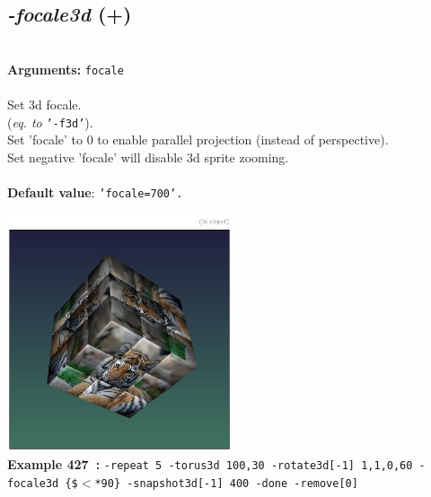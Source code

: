\documentclass[a4paper,11pt,twoside]{book}
\begin{document}
\subsection{\emph{-focale3d} (+)}\vspace*{-0.5em}
~\\\textbf{Arguments: } 
{\small \texttt{focale}}\\~\\
Set 3d focale.
~\\(\emph{eq. to} {\small \texttt{'-f3d'}}).
~\\Set 'focale' to 0 to enable parallel projection (instead of perspective).
~\\Set negative 'focale' will disable 3d sprite zooming.
~\\~\\\textbf{Default value}: {\small \texttt{'focale=700'.}}
\begin{center}\includegraphics[keepaspectratio=true,height=7cm,width=\textwidth]{img/gmic_def427.jpg}\\
{\footnotesize \textbf{Example 427~:} \texttt{-repeat 5 -torus3d 100,30 -rotate3d[-1] 1,1,0,60 -focale3d \{\$$<$*90\} -snapshot3d[-1] 400 -done -remove[0]}}
\end{center}
\end{document}
